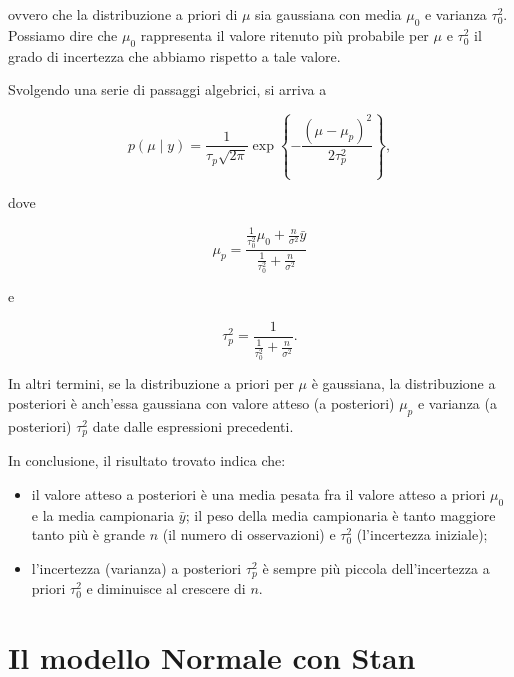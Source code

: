 \documentclass[
  11pt,
]{krantz}
\providecommand{\tightlist}{%
  \setlength{\itemsep}{0pt}\setlength{\parskip}{0pt}}
\theoremstyle{definition}
\theoremstyle{definition}
\theoremstyle{definition}
\theoremstyle{definition}
\theoremstyle{remark}
\begin{document}
ovvero che la distribuzione a priori di \(\mu\) sia gaussiana con media \(\mu_0\) e varianza \(\tau_0^2\). Possiamo dire che \(\mu_0\) rappresenta il valore ritenuto più probabile per \(\mu\) e \(\tau_0^2\) il grado di incertezza che abbiamo rispetto a tale valore.

Svolgendo una serie di passaggi algebrici, si arriva a

\begin{equation}
p(\mu \mid y) = \frac{1}{{\tau_p \sqrt {2\pi}}}\exp\left\{{-\frac{(\mu - \mu_p)^2}{2\tau_p^2}}\right\},
\label{eq:post-norm-norm}
\end{equation}

dove

\begin{equation}
\mu_p = \frac{\frac{1}{\tau_0^2}\mu_0+ \frac{n}{\sigma^2}\bar{y}}{\frac {1}{\tau_0^2} + \frac{n}{\sigma^2}} 
\label{eq:post-norm-mup}
\end{equation}

e

\begin{equation}
\tau_p^2 = \frac{1}{\frac {1}{\tau_0^2}+ \frac{n}{\sigma^2}}.
\label{eq:post-norm-taup2}
\end{equation}

In altri termini, se la distribuzione a priori per \(\mu\) è gaussiana, la distribuzione a posteriori è anch'essa gaussiana con valore atteso (a posteriori) \(\mu_p\) e varianza (a posteriori) \(\tau_p^2\) date dalle espressioni precedenti.

In conclusione, il risultato trovato indica che:

\begin{itemize}
\tightlist
\item
  il valore atteso a posteriori è una media pesata fra il valore atteso a priori \(\mu_0\) e la media campionaria \(\bar{y}\); il peso della media campionaria è tanto maggiore tanto più è grande \(n\) (il numero di osservazioni) e \(\tau_0^2\) (l'incertezza iniziale);
\item
  l'incertezza (varianza) a posteriori \(\tau_p^2\) è sempre più piccola dell'incertezza a priori \(\tau_0^2\) e diminuisce al crescere di \(n\).
\end{itemize}

\hypertarget{il-modello-normale-con-stan}{%
\section{Il modello Normale con Stan}\label{il-modello-normale-con-stan}}
\end{document}
